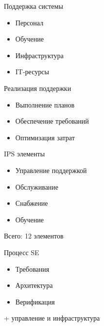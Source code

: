 \documentclass{beamer}
\begin{document}

\begin{frame}{Поддержка системы}
\begin{itemize}
    \item Персонал
    \item Обучение
    \item Инфраструктура
    \item IT-ресурсы
\end{itemize}

\end{frame}


\begin{frame}{Реализация поддержки}
\begin{itemize}
    \item Выполнение планов
    \item Обеспечение требований
    \item Оптимизация затрат
\end{itemize}

\end{frame}


\begin{frame}{IPS элементы}
\begin{itemize}
    \item Управление поддержкой
    \item Обслуживание
    \item Снабжение
    \item Обучение
\end{itemize}

\vspace{0.5cm}

Всего: 12 элементов

\end{frame}


\begin{frame}{Процесс SE}
\begin{itemize}
    \item Требования
    \item Архитектура
    \item Верификация
\end{itemize}

\vspace{0.5cm}

+ управление и инфраструктура

\end{frame}
\end{document}
